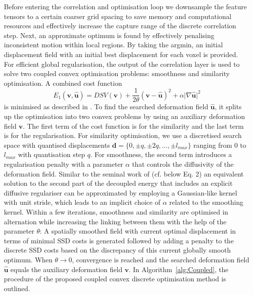 Before entering the correlation and optimisation loop we downsample the feature tensors to a certain coarser grid spacing to save memory and computational resources and effectively increase the capture range of the discrete correlation step. Next, an approximate optimum is found by effectively penalising inconsistent motion within local regions. By taking the argmin, an initial displacement field with an initial best displacement for each voxel is provided. 
For efficient global regularisation, the output of the correlation layer is used to solve two coupled convex optimisation problems: smoothness and similarity optimisation. A combined cost function
\begin{equation}\label{eqDecouple2}
E_{1}(\mathbf{v},\mathbf{\hat{u}})=DSV(\mathbf{v})+\frac{1}{2\theta}(\mathbf{v}-\mathbf{\hat{u}})^2+\alpha\vert\nabla\mathbf{\hat{u}}\vert^2
\end{equation}
is minimised as described in \citep{heinrich2014non}. To find the searched deformation field $\mathbf{\hat{u}}$, it splits up the optimisation into two convex problems by using an auxiliary deformation field $\mathbf{v}$. The first term of the cost function is for the similarity and the last term is for the regularisation. For similarity optimisation, we use a discretised search space with quantised displacements $\mathbf{d} = \{0,\pm q, \pm 2q, ..., \pm l_{max}\}$ ranging from $0$ to $l_{max}$ with quantisation step $q$. For smoothness, the second term introduces a regularisation penalty with a parameter $\alpha$ that controls the diffusivity of the deformation field. Similar to the seminal work of \citep{vercauteren2009diffeomorphic} (cf. below Eq. 2) an equivalent solution to the second part of the decoupled energy that includes an explicit diffusive regulariser can be approximated by employing a Gaussian-like kernel with unit stride, which leads to an implicit choice of $\alpha$ related to the smoothing kernel. Within a few iterations, smoothness and similarity are optimised in alternation while increasing the linking between them with the help of the parameter  $\theta$: A spatially smoothed field with current optimal displacement in terms of minimal SSD costs is generated followed by adding a penalty to the discrete SSD costs based on the discrepancy of this current globally smooth optimum. When $\theta \rightarrow 0$, convergence is reached and the searched deformation field $\mathbf{\hat{u}}$ equals the auxiliary deformation field $\mathbf{v}$. In Algorithm~\ref{alg:Coupled}, the procedure of the proposed coupled convex discrete optimisation method is outlined.

